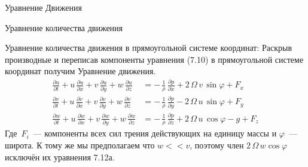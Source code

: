 \begin{chapter}{Уравнение Движения}
\begin{section}{Уравнение количества движения}
\begin{paragraph}{Уравнение количества движения в прямоугольной системе координат:}
Раскрыв производные и переписав компоненты уравнения (7.10) в
прямоугольной системе координат получим Уравнение движения.
\begin{subequations}
\begin{align}
\frac{\partial{u}}{\partial{t}} + u\,\frac{\partial{u}}{\partial{x}}
+ v\,\frac{\partial{u}}{\partial{y}} +w\,\frac{\partial{u}}{\partial{z}} &=
-\,\frac{1}{\rho}\,\frac{\partial{p}}{\partial{x}} +
2\,\Omega\,{v}\,\sin\varphi +  F_x \\
 \frac{\partial{v}}{\partial{t}} + u\,\frac{\partial{v}}{\partial{x}} +
v\,\frac{\partial{v}}{\partial{y}} +w\,\frac{\partial{v}}{\partial{z}} &=
-\,\frac{1}{\rho}\,\frac{\partial{p}}{\partial{y}} - 2\,\Omega\,u\,\sin\varphi
+ F_y
\\
 \frac{\partial{w}}{\partial{t}} + u\,\frac{\partial{w}}{\partial{x}} +
v\,\frac{\partial{w}}{\partial{y}} +w\,\frac{\partial{w}}{\partial{z}} &=
-\,\frac{1}{\rho}\,\frac{\partial{p}}{\partial{z}} + 2\,\Omega\,{u}\,\cos\varphi
- g + F_z
\end{align}
\end{subequations}
Где~$F_i$~--- компоненты всех сил трения действующих на единицу массы
и $\varphi$~--- широта. К тому же мы предполагаем что $w<<v$, поэтому
член $2\,\Omega\,w \cos \varphi$ исключён их уравнения 7.12а.
%


\end{paragraph}
\end{section}
\end{chapter}
